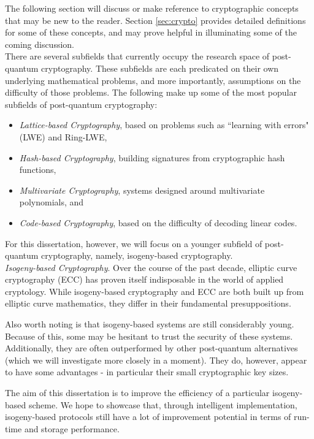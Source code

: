 The following section will discuss or make reference to cryptographic concepts that may be new to the reader. Section  \ref{sec:crypto} provides detailed definitions for some of these concepts, and may prove helpful in illuminating some of the coming discussion.\\

There are several subfields that currently occupy the research space of post-quantum cryptography. These subfields are each predicated on their own underlying mathematical problems, and more importantly, assumptions on the difficulty of those problems. The following make up some of the most popular subfields of post-quantum cryptography:
\begin{itemize}
\item \textit{Lattice-based Cryptography}, based on problems such as ``learning with errors" (LWE) and Ring-LWE,
\item \textit{Hash-based Cryptography}, building signatures from cryptographic hash functions,
\item \textit{Multivariate Cryptography}, systems designed around multivariate polynomials, and
\item \textit{Code-based Cryptography}, based on the difficulty of decoding linear codes.
\end{itemize}

For this dissertation, however, we will focus on a younger subfield of post-quantum cryptography, namely, isogeny-based cryptography.\\

\noindent
\textit{Isogeny-based Cryptography}. Over the course of the past decade, elliptic curve cryptography (ECC) has proven itself indisposable in the world of applied cryptology. While isogeny-based cryptography and ECC are both built up from elliptic curve mathematics, they differ in their fundamental presuppositions.

Also worth noting is that isogeny-based systems are still considerably young. Because of this, some may be hesitant to trust the security of these systems. Additionally, they are often outperformed by other post-quantum alternatives (which we will investigate more closely in a moment). They do, however, appear to have some advantages - in particular their small cryptographic key sizes.

The aim of this dissertation is to improve the efficiency of a particular isogeny-based scheme. We hope to showcase that, through intelligent implementation, isogeny-based protocols still have a lot of improvement potential in terms of run-time and storage performance.

